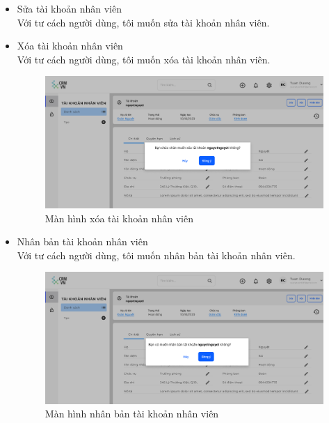 \documentclass[12pt,a4paper]{article}
\begin{document}
\begin{enumerate}
\begin{itemize}
            \item Sửa tài khoản nhân viên \\
            Với tư cách người dùng, tôi muốn sửa tài khoản nhân viên.

            \item Xóa tài khoản nhân viên \\
            Với tư cách người dùng, tôi muốn xóa tài khoản nhân viên.

            \begin{figure}[H]
                \centering \includegraphics[width=\textwidth]{Img/Nguyet/TKNV/xoa.png}
                \vspace{0.5cm}
                \caption{Màn hình xóa tài khoản nhân viên}
                \label{xoatknv}
            \end{figure}

            \item Nhân bản tài khoản nhân viên\\
            Với tư cách người dùng, tôi muốn nhân bản tài khoản nhân viên.

            \begin{figure}[H]
                \centering \includegraphics[width=\textwidth]{Img/Nguyet/TKNV/nhanban.png}
                \vspace{0.5cm}
                \caption{Màn hình nhân bản tài khoản nhân viên}
                \label{nhanbans}
            \end{figure}


\end{itemize}
\end{enumerate}
\end{document}
